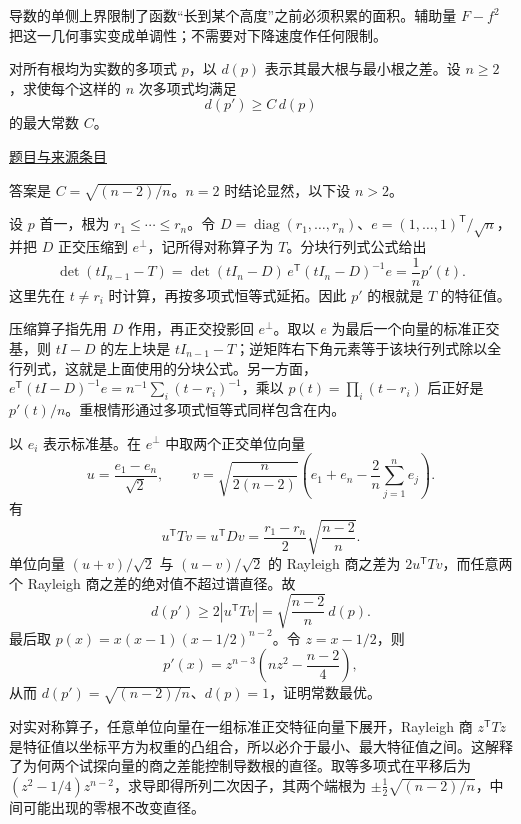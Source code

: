\documentclass[12pt,fontset=fandol]{ctexart}
\begin{document}
\begin{remark}[方法与条件]导数的单侧上界限制了函数“长到某个高度”之前必须积累的面积。辅助量 $F-f^2$ 把这一几何事实变成单调性；不需要对下降速度作任何限制。\end{remark}

\begin{example}[来源序号4]\label{ex:fin05-hi:4}\label{pr:fin05-hi:4}

对所有根均为实数的多项式 $p$，以 $d(p)$ 表示其最大根与最小根之差。设 $n\ge2$，求使每个这样的 $n$ 次多项式均满足
\[
d(p')\ge C\,d(p)
\]
的最大常数 $C$。

\par\href{https://github.com/lzxcr/cmc-mathematics/blob/64916fa1fdbc3e444a652eca204d5669058ee321/src/problems/finals/05/04.md}{题目与来源条目}

\end{example}

\begin{solve}\label{ans:fin05-hi:4}

答案是 $C=\sqrt{(n-2)/n}$。$n=2$ 时结论显然，以下设 $n>2$。

设 $p$ 首一，根为 $r_1\le\cdots\le r_n$。令
$D=\operatorname{diag}(r_1,\ldots,r_n)$、$e=(1,\ldots,1)^{\mathsf T}/\sqrt n$，并把 $D$ 正交压缩到 $e^\perp$，记所得对称算子为 $T$。分块行列式公式给出
\[
\det(tI_{n-1}-T)
=\det(tI_n-D)\,e^{\mathsf T}(tI_n-D)^{-1}e
=\frac1n p'(t).
\]
这里先在 $t\ne r_i$ 时计算，再按多项式恒等式延拓。因此 $p'$ 的根就是 $T$ 的特征值。

压缩算子指先用 $D$ 作用，再正交投影回 $e^\perp$。取以 $e$ 为最后一个向量的标准正交基，则 $tI-D$ 的左上块是 $tI_{n-1}-T$；逆矩阵右下角元素等于该块行列式除以全行列式，这就是上面使用的分块公式。另一方面，$e^{\mathsf T}(tI-D)^{-1}e=n^{-1}\sum_i(t-r_i)^{-1}$，乘以 $p(t)=\prod_i(t-r_i)$ 后正好是 $p'(t)/n$。重根情形通过多项式恒等式同样包含在内。

以 $e_i$ 表示标准基。在 $e^\perp$ 中取两个正交单位向量
\[
u=\frac{e_1-e_n}{\sqrt2},\qquad
v=\sqrt{\frac{n}{2(n-2)}}
\left(e_1+e_n-\frac2n\sum_{j=1}^n e_j\right).
\]
有
\[
u^{\mathsf T}Tv=u^{\mathsf T}Dv
=\frac{r_1-r_n}{2}\sqrt{\frac{n-2}{n}}.
\]
单位向量 $(u+v)/\sqrt2$ 与 $(u-v)/\sqrt2$ 的 Rayleigh 商之差为 $2u^{\mathsf T}Tv$，而任意两个 Rayleigh 商之差的绝对值不超过谱直径。故
\[
d(p')\ge2|u^{\mathsf T}Tv|=\sqrt{\frac{n-2}{n}}\,d(p).
\]
最后取 $p(x)=x(x-1)(x-1/2)^{n-2}$。令 $z=x-1/2$，则
\[
p'(x)=z^{n-3}\left(nz^2-\frac{n-2}{4}\right),
\]
从而 $d(p')=\sqrt{(n-2)/n}$、$d(p)=1$，证明常数最优。

对实对称算子，任意单位向量在一组标准正交特征向量下展开，Rayleigh 商 $z^{\mathsf T}Tz$ 是特征值以坐标平方为权重的凸组合，所以必介于最小、最大特征值之间。这解释了为何两个试探向量的商之差能控制导数根的直径。取等多项式在平移后为 $(z^2-1/4)z^{n-2}$，求导即得所列二次因子，其两个端根为 $\pm\tfrac12\sqrt{(n-2)/n}$，中间可能出现的零根不改变直径。

\end{solve}
\end{document}
